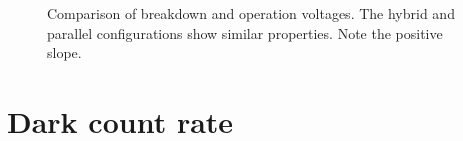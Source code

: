 \begin{figure}[t]
	\hfill
	\hfill
	\caption[Comparison of breakdown and operation voltages]{Comparison of breakdown and operation voltages. The hybrid and parallel configurations show similar properties. Note the positive slope.}
	\label{fig:ch4:breakdown_fits}
\end{figure}


\section{Dark count rate}

